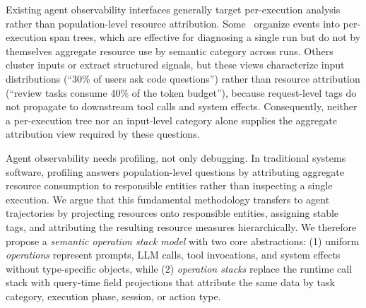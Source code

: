 \documentclass[letterpaper]{article}
\begin{document}
Existing agent observability interfaces generally target per-execution
analysis rather than population-level resource attribution.
Some~\cite{langsmith,langfuse,phoenix,otel} organize events into
per-execution span trees, which are effective for diagnosing a single
run but do not by themselves aggregate resource use by semantic
category across runs.
Others~\cite{datadog-llmobs,laminar-signals} cluster inputs or extract
structured signals, but these views characterize input distributions
(``30\% of users ask code questions'') rather than resource attribution
(``review tasks consume 40\% of the token budget''), because
request-level tags do not propagate to downstream tool calls and system
effects.
Consequently, neither a per-execution tree nor an input-level category
alone supplies the aggregate attribution view required by these questions.

Agent observability needs profiling, not only debugging.
In traditional systems software, profiling answers population-level
questions by attributing aggregate resource consumption to responsible
entities rather than inspecting a single execution.
We argue that this fundamental methodology transfers to agent trajectories by
projecting resources onto responsible entities, assigning stable tags, and
attributing the resulting resource measures hierarchically.
We therefore propose a \emph{semantic operation stack model} with two
core abstractions: (1) uniform \emph{operations} represent prompts, LLM
calls, tool invocations, and system effects without type-specific
objects, while (2) \emph{operation stacks} replace the runtime call stack
with query-time field projections that attribute the same data by task
category, execution phase, session, or action type.
\end{document}
